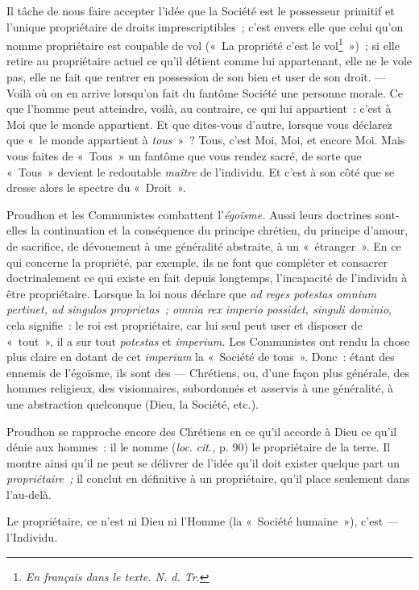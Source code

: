 \documentclass[french,twoside]{book} %
\begin{document}
Il tâche de nous faire accepter l’idée que la Société est le possesseur primitif et l’unique propriétaire de droits imprescriptibles ; c’est envers elle que celui qu’on nomme propriétaire est coupable de vol (« La propriété c’est le vol\footnote{ \noindent \emph{En français dans le texte. N. d. Tr.}
 } ») ; si elle retire au propriétaire actuel ce qu’il détient comme lui appartenant, elle ne le vole pas, elle ne fait que rentrer en possession de son bien et user de son droit. — Voilà où on en arrive lorsqu’on fait du fantôme Société une personne morale. Ce que l’homme peut atteindre, voilà, au contraire, ce qui lui appartient : c’est à Moi que le monde appartient. Et que dites-vous d’autre, lorsque vous déclarez que « le monde appartient à \emph{tous} » ? Tous, c’est Moi, Moi, et encore Moi. Mais vous faites de « Tous » un fantôme que vous rendez sacré, de sorte que « Tous » devient le redoutable \emph{maître} de l’individu. Et c’est à son côté que se dresse alors le spectre du « Droit ».\par
Proudhon et les Communistes combattent l’\emph{égoïsme.}  Aussi leurs doctrines sont-elles la continuation et la conséquence du principe chrétien, du principe d’amour, de sacrifice, de dévouement à une généralité abstraite, à un « étranger ». En ce qui concerne la propriété, par exemple, ils ne font que compléter et consacrer doctrinalement ce qui existe en fait depuis longtemps, l’incapacité de l’individu à être propriétaire. Lorsque la loi nous déclare que \emph{ad reges potestas omnium pertinet, ad singulos proprietas ; omnia rex imperio possidet, singuli dominio}, cela signifie : le roi est propriétaire, car lui seul peut user et disposer de « tout », il a sur tout \emph{potestas} et \emph{imperium.} Les Communistes ont rendu la chose plus claire en dotant de cet \emph{imperium} la « Société de tous ». Donc : étant des ennemis de l’égoïsme, ils sont des — Chrétiens, ou, d’une façon plus générale, des hommes religieux, des visionnaires, subordonnés et asservis à une généralité, à une abstraction quelconque (Dieu, la Société, etc.).\par
Proudhon se rapproche encore des Chrétiens en ce qu’il accorde à Dieu ce qu’il dénie aux hommes : il le nomme (\emph{loc}. \emph{cit.,} p. 90) le propriétaire de la terre. Il montre ainsi qu’il ne peut se délivrer de l’idée qu’il doit exister quelque part un \emph{propriétaire ;} il conclut en définitive à un propriétaire, qu’il place seulement dans l’au-delà.\par
Le propriétaire, ce n’est ni Dieu ni l’Homme (la « Société humaine »), c’est — l’Individu.\par
\end{document}
